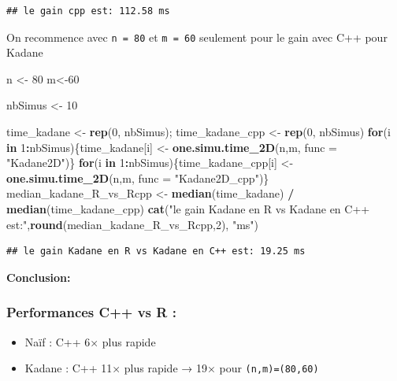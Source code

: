 \documentclass[
]{article}
\newenvironment{Shaded}{\begin{snugshade}}{\end{snugshade}}
\newcommand{\AttributeTok}[1]{\textcolor[rgb]{0.13,0.29,0.53}{#1}}
\newcommand{\ControlFlowTok}[1]{\textcolor[rgb]{0.13,0.29,0.53}{\textbf{#1}}}
\newcommand{\DecValTok}[1]{\textcolor[rgb]{0.00,0.00,0.81}{#1}}
\newcommand{\FunctionTok}[1]{\textcolor[rgb]{0.13,0.29,0.53}{\textbf{#1}}}
\newcommand{\NormalTok}[1]{#1}
\newcommand{\OtherTok}[1]{\textcolor[rgb]{0.56,0.35,0.01}{#1}}
\newcommand{\SpecialCharTok}[1]{\textcolor[rgb]{0.81,0.36,0.00}{\textbf{#1}}}
\newcommand{\StringTok}[1]{\textcolor[rgb]{0.31,0.60,0.02}{#1}}
\providecommand{\tightlist}{%
  \setlength{\itemsep}{0pt}\setlength{\parskip}{0pt}}
\begin{document}
\begin{verbatim}
## le gain cpp est: 112.58 ms
\end{verbatim}

On recommence avec \texttt{n\ =\ 80} et \texttt{m\ =\ 60} seulement pour
le gain avec C++ pour Kadane

\begin{Shaded}
\begin{Highlighting}[]
\NormalTok{n }\OtherTok{\textless{}{-}} \DecValTok{80}
\NormalTok{m}\OtherTok{\textless{}{-}}\DecValTok{60}

\NormalTok{nbSimus }\OtherTok{\textless{}{-}} \DecValTok{10}

\NormalTok{time\_kadane }\OtherTok{\textless{}{-}} \FunctionTok{rep}\NormalTok{(}\DecValTok{0}\NormalTok{, nbSimus); time\_kadane\_cpp }\OtherTok{\textless{}{-}} \FunctionTok{rep}\NormalTok{(}\DecValTok{0}\NormalTok{, nbSimus)}
\ControlFlowTok{for}\NormalTok{(i }\ControlFlowTok{in} \DecValTok{1}\SpecialCharTok{:}\NormalTok{nbSimus)\{time\_kadane[i] }\OtherTok{\textless{}{-}} \FunctionTok{one.simu.time\_2D}\NormalTok{(n,m, }\AttributeTok{func =} \StringTok{"Kadane2D"}\NormalTok{)\}}
\ControlFlowTok{for}\NormalTok{(i }\ControlFlowTok{in} \DecValTok{1}\SpecialCharTok{:}\NormalTok{nbSimus)\{time\_kadane\_cpp[i] }\OtherTok{\textless{}{-}} \FunctionTok{one.simu.time\_2D}\NormalTok{(n,m, }\AttributeTok{func =} \StringTok{"Kadane2D\_cpp"}\NormalTok{)\}}
\NormalTok{median\_kadane\_R\_vs\_Rcpp }\OtherTok{\textless{}{-}} \FunctionTok{median}\NormalTok{(time\_kadane) }\SpecialCharTok{/} \FunctionTok{median}\NormalTok{(time\_kadane\_cpp)}
\FunctionTok{cat}\NormalTok{(}\StringTok{"le gain Kadane en R vs Kadane en C++ est:"}\NormalTok{,}\FunctionTok{round}\NormalTok{(median\_kadane\_R\_vs\_Rcpp,}\DecValTok{2}\NormalTok{), }\StringTok{"ms"}\NormalTok{)}
\end{Highlighting}
\end{Shaded}

\begin{verbatim}
## le gain Kadane en R vs Kadane en C++ est: 19.25 ms
\end{verbatim}

\textbf{Conclusion:}

\subsubsection{Performances C++ vs R :}\label{performances-c-vs-r}

\begin{itemize}
\tightlist
\item
  Naïf : C++ 6× plus rapide\\
\item
  Kadane : C++ 11× plus rapide → 19× pour \texttt{(n,m)=(80,60)}
\end{itemize}
\end{document}
